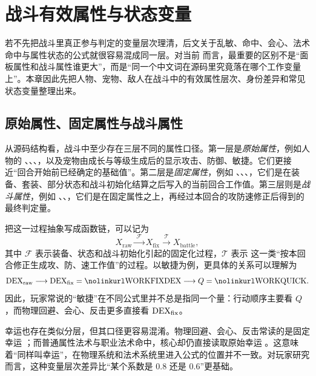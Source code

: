 \chapter{战斗有效属性与状态变量}

若不先把战斗里真正参与判定的变量层次理清，后文关于乱敏、命中、会心、法术命中与属性状态的公式就很容易混成同一层。对当前  而言，最重要的区别不是“面板属性和战斗属性谁更大”，而是“同一个中文词在源码里究竟落在哪个工作变量上”。本章因此先把人物、宠物、敌人在战斗中的有效属性层次、身份差异和常见状态变量整理出来。

\section{原始属性、固定属性与战斗属性}

从源码结构看，战斗中至少存在三层不同的属性口径。第一层是\emph{原始属性}，例如人物的 、、、，以及宠物由成长与等级生成后的显示攻击、防御、敏捷。它们更接近“回合开始前已经确定的基础值”。第二层是\emph{固定属性}，例如 、、、，它们是在装备、套装、部分状态和战斗初始化结算之后写入的当前回合工作值。第三层则是\emph{战斗属性}，例如 、、，它们是在固定属性之上，再经过本回合的攻防速修正后得到的最终判定量。

把这一过程抽象写成函数链，可以记为
\begin{equation}
    X_{\mathrm{raw}}
    \xrightarrow{\;\mathcal{F}\;}
    X_{\mathrm{fix}}
    \xrightarrow{\;\mathcal{T}\;}
    X_{\mathrm{battle}},
\end{equation}
其中 $\mathcal{F}$ 表示装备、状态和战斗初始化引起的固定化过程，$\mathcal{T}$ 表示  这一类“按本回合修正生成攻、防、速工作值”的过程。以敏捷为例，更具体的关系可以理解为
\begin{equation}
    \dex_{\mathrm{raw}} \longrightarrow \dex_{\mathrm{fix}}=\code{WORKFIXDEX}
    \longrightarrow Q=\code{WORKQUICK}.
\end{equation}
因此，玩家常说的“敏捷”在不同公式里并不总是指同一个量：行动顺序主要看 $Q$，而物理回避、会心、反击更多直接看 $\mathrm{DEX}_{\mathrm{fix}}$。

幸运也存在类似分层，但其口径更容易混淆。物理回避、会心、反击常读的是固定幸运 ；而普通属性法术与职业法术命中，核心却仍直接读取原始幸运 。这意味着“同样叫幸运”，在物理系统和法术系统里进入公式的位置并不一致。对玩家研究而言，这种变量层次差异比“某个系数是 $0.8$ 还是 $0.6$”更基础。

